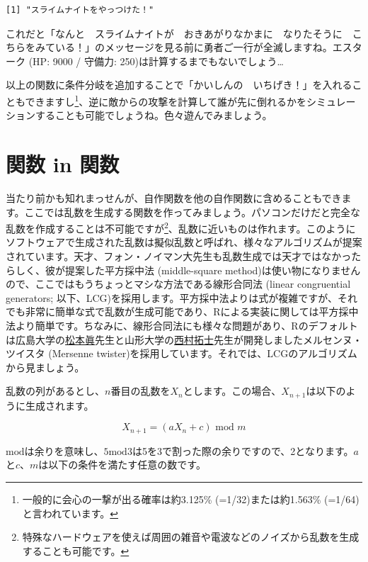 \documentclass[
  a4paper,
  pandoc,
  ja=standard,
  jafont=haranoaji]{bxjsbook}
\begin{document}
\begin{verbatim}
[1] "スライムナイトをやっつけた！"
\end{verbatim}

これだと「なんと　スライムナイトが　おきあがりなかまに　なりたそうに　こちらをみている！」のメッセージを見る前に勇者ご一行が全滅しますね。エスターク
(HP: 9000 / 守備力: 250)は計算するまでもないでしょう\ldots{}

以上の関数に条件分岐を追加することで「かいしんの　いちげき！」を入れることもできますし\footnote{一般的に会心の一撃が出る確率は約3.125\%
  (=1/32)または約1.563\% (=1/64)と言われています。}、逆に敵からの攻撃を計算して誰が先に倒れるかをシミュレーションすることも可能でしょうね。色々遊んでみましょう。

\hypertarget{sec-func_in_func}{%
\section{関数 in 関数}\label{sec-func_in_func}}

当たり前かも知れまっせんが、自作関数を他の自作関数に含めることもできます。ここでは乱数を生成する関数を作ってみましょう。パソコンだけだと完全な乱数を作成することは不可能ですが\footnote{特殊なハードウェアを使えば周囲の雑音や電波などのノイズから乱数を生成することも可能です。}、乱数に近いものは作れます。このようにソフトウェアで生成された乱数は擬似乱数と呼ばれ、様々なアルゴリズムが提案されています。天才、フォン・ノイマン大先生も乱数生成では天才ではなかったらしく、彼が提案した平方採中法
(middle-square
method)は使い物になりませんので、ここではもうちょっとマシな方法である線形合同法
(linear congruential generators;
以下、LCG)を採用します。平方採中法よりは式が複雑ですが、それでも非常に簡単な式で乱数が生成可能であり、Rによる実装に関しては平方採中法より簡単です。ちなみに、線形合同法にも様々な問題があり、Rのデフォルトは広島大学の\href{http://www.math.sci.hiroshima-u.ac.jp/~m-mat/index.html}{松本眞}先生と山形大学の\href{http://yudb.kj.yamagata-u.ac.jp/html/428_ja.html}{西村拓士}先生が開発しましたメルセンヌ・ツイスタ
(Mersenne
twister)を採用しています。それでは、LCGのアルゴリズムから見ましょう。

乱数の列があるとし、\(n\)番目の乱数を\(X_n\)とします。この場合、\(X_{n+1}\)は以下のように生成されます。

\[
X_{n+1} = (aX_n + c) \text{ mod } m
\]

\(\text{mod}\)は余りを意味し、\(5 \text{mod} 3\)は5を3で割った際の余りですので、2となります。\(a\)と\(c\)、\(m\)は以下の条件を満たす任意の数です。
\end{document}
